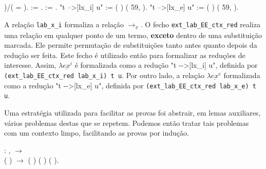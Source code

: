   )/(
= ).\coqdoceol \coqdocemptyline \coqdocnoindent
{}  :=
 .\coqdoceol
\coqdocemptyline \coqdocnoindent {} 
:=  .\coqdoceol
\coqdocemptyline \coqdocnoindent {} "t -->[lx\_i] u" :=
(  ) (
 59,  ).\coqdoceol
\coqdocnoindent {} "t -->[lx\_e] u" :=
(  ) (
 59,  ).\coqdoceol

\bigskip

A relação \texttt{lab\_x\_i} formaliza a relação $\rightarrow_{\underline{x}}$.
O fecho \texttt{ext\_lab\_EE\_ctx\_red} realiza uma relação em qualquer ponto de
um termo, \textbf{exceto} dentro de uma substituição marcada. Ele permite
permutação de substituições tanto antes quanto depois da redução ser feita. Este
fecho é utilizado então para formalizar as reduções de interesse. Assim,
$\lambda \underline{ex}^i$ é formalizada como a redução "t -{}->[lx\_i] u",
definida por \texttt{(ext\_lab\_EE\_ctx\_red lab\_x\_i) t u}. Por outro lado, a
relação $\lambda \underline{ex}^e$ formalizada como a redução "t -{}->[lx\_e] u",
definida por \texttt{(ext\_lab\_EE\_ctx\_red lab\_x\_e) t u}. 

Uma estratégia utilizada para facilitar as provas foi abstrair, em lemas
auxiliares, vários problemas destas que se repetem. Podemos então tratar tais
problemas com um contexto limpo, facilitando as provas por indução. 

\bigskip
{} :
\coqdockw{\ensuremath{\forall}}   
,   \ensuremath{\rightarrow} \\
 (
)   \ensuremath{\rightarrow}
 (
) (  )
(  ).\coqdoceol

\smallskip

